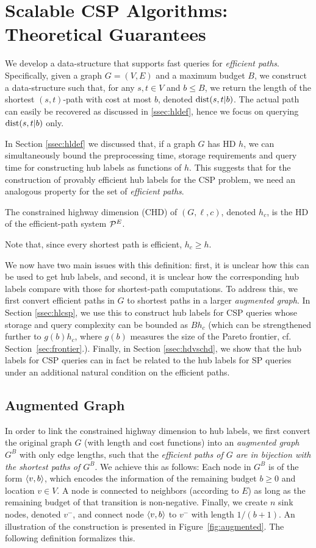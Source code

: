 \documentclass[opre,nonblindrev]{informs3} %
\begin{document}
\section{Scalable CSP Algorithms: Theoretical Guarantees}
\label{sec:chd}
We develop a data-structure that supports fast queries for \emph{efficient paths}. 
Specifically, given a graph $G=(V,E)$ and a maximum budget $B$, we construct a data-structure such that, for any $s,t\in V$ and $b\leq B$, we return the length of the shortest $(s,t)$-path with cost at most $b$, denoted $\mbox{dist}(s,t|b)$.
The actual path can easily be recovered as discussed in \cref{ssec:hldef}, hence we focus on querying $\mbox{dist}(s,t|b)$ only.

In Section \ref{ssec:hldef} we discussed that, if a graph $G$ has HD $h$, we can simultaneously bound the preprocessing time, storage requirements and query time for constructing hub labels as functions of $h$.
This suggests that for the construction of provably efficient hub labels for the CSP problem, we need an analogous property for the set of \emph{efficient paths}.
\begin{definition} The constrained highway dimension (CHD) of $(G,\ell,c)$, denoted $h_c$, is the HD of the efficient-path system $\mathcal{P}^E$.
\end{definition}
Note that, since every shortest path is efficient, $h_c\geq h$.

We now have two main issues with this definition: first, it is unclear how this can be used to get hub labels, and second, it is unclear how the corresponding hub labels compare with those for shortest-path computations. 
To address this, we first convert efficient paths in $G$ to shortest paths in a larger \emph{augmented graph}. 
In Section \ref{ssec:hlcsp}, we use this to construct hub labels for CSP queries whose storage and query complexity can be bounded as $Bh_c$ (which can be strengthened further to $g(b)h_c$, where $g(b)$ measures the size of the Pareto frontier, cf. Section~\ref{sec:frontier}.). 
Finally, in Section \ref{ssec:hdvschd}, we show that the hub labels for CSP queries can in fact be related to the hub labels for SP queries under an additional natural condition on the efficient paths.

\subsection{Augmented Graph}
\label{ssec:aug}
In order to link the constrained highway dimension to hub labels, we first convert the original graph $G$ (with length and cost functions) into an \emph{augmented graph} $G^B$ with only edge lengths, such that the \emph{efficient paths of $G$ are in bijection with the shortest paths of $G^B$}.
We achieve this as follows: Each node in $G^B$ is of the form $\langle v,b\rangle$, which encodes the information of the remaining budget $b\geq 0$ and location $v\in V$.
A node is connected to neighbors (according to $E$) as long as the remaining budget of that transition is non-negative.
Finally, we create $n$ sink nodes, denoted $v^-$, and connect node $\langle v,b\rangle$ to $v^-$ with length $1/(b+1)$.
An illustration of the construction is presented in Figure~\ref{fig:augmented}.
The following definition formalizes this. 
\end{document}
